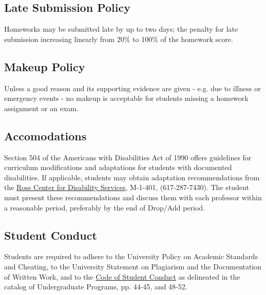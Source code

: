 \documentclass[12pt,letterpaper,twoside]{article}
\begin{document}
\subsection*{Late Submission Policy}
Homeworks may be submitted late by up to two days; the penalty for late submission increasing linearly from 20\% to 100\% of the homework score.

\subsection*{Makeup Policy}
Unless a good reason and its supporting evidence are given - e.g. due to illness or emergency events - no makeup is acceptable for students missing a homework assignment or an exam.

\subsection*{Accomodations}
Section 504 of the Americans with Disabilities Act of 1990 offers guidelines for curriculum modifications and adaptations for students with documented disabilities. If applicable, students may obtain adaptation recommendations from the \href{http://www.umb.edu/academics/vpass/disability}{Ross Center for Disability Services}, M-1-401, (617-287-7430). The student must present these recommendations and discuss them with each professor within a reasonable period, preferably by the end of Drop/Add period.

\subsection*{Student Conduct}
Students are required to adhere to the University Policy on Academic Standards and Cheating, to the University Statement on Plagiarism and the Documentation of Written Work, and to the \href{http://www.umb.edu/life_on_campus/policies/community/code}{Code of Student Conduct} as delineated in the catalog of Undergraduate Programs, pp. 44-45, and 48-52.
\end{document}
